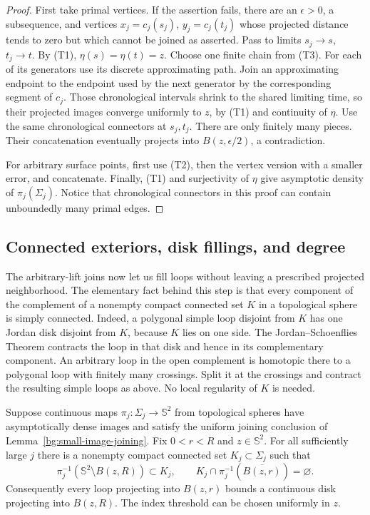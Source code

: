 \begin{proof}
First take primal vertices. If the assertion fails, there are an
$\epsilon>0$, a subsequence, and vertices
$x_j=c_j(s_j)$, $y_j=c_j(t_j)$ whose projected distance tends to zero
but which cannot be joined as asserted. Pass to limits $s_j\to s$,
$t_j\to t$. By (T1), $\eta(s)=\eta(t)=z$. Choose one finite chain
from (T3). For each of its generators use its discrete approximating
path. Join an approximating endpoint to the endpoint used by the
next generator by the corresponding segment of $c_j$. Those
chronological intervals shrink to the shared limiting time, so their
projected images converge uniformly to $z$, by (T1) and continuity
of $\eta$. Use the same chronological connectors at $s_j,t_j$.
There are only finitely many pieces. Their concatenation eventually
projects into $B(z,\epsilon/2)$, a contradiction.

For arbitrary surface points, first use (T2), then the vertex version
with a smaller error, and concatenate. Finally, (T1) and surjectivity
of $\eta$ give asymptotic density of $\pi_j(\Sigma_j)$.
Notice that chronological connectors in this proof can contain
unboundedly many primal edges.
\end{proof}

\subsection{Connected exteriors, disk fillings, and degree}

The arbitrary-lift joins now let us fill loops without leaving a
prescribed projected neighborhood. The elementary fact behind this
step is that every component of the complement of a nonempty compact
connected set $K$ in a topological sphere is simply connected. Indeed,
a polygonal simple loop disjoint from $K$ has one Jordan disk disjoint
from $K$, because $K$ lies on one side. The Jordan--Schoenflies
Theorem contracts the loop in that disk and hence in its complementary
component. An arbitrary loop in the open complement is homotopic
there to a polygonal loop with finitely many crossings. Split it at
the crossings and contract the resulting simple loops as above.
No local regularity of $K$ is needed.

\begin{lemma}
\label{bg:small-loop-filling}
Suppose continuous maps $\pi_j:\Sigma_j\to\mathbb S^2$ from
topological spheres have asymptotically dense images and satisfy the
uniform joining conclusion of Lemma~\ref{bg:small-image-joining}.
Fix $0<r<R$ and $z\in\mathbb S^2$. For all sufficiently large $j$
there is a nonempty compact connected set $K_j\subset\Sigma_j$
such that
\[
 \pi_j^{-1}(\mathbb S^2\setminus B(z,R))\subset K_j,
 \qquad K_j\cap\pi_j^{-1}(\overline{B(z,r)})=\varnothing.
\]
Consequently every loop projecting into $B(z,r)$ bounds a continuous
disk projecting into $B(z,R)$. The index threshold can be chosen
uniformly in $z$.
\end{lemma}

